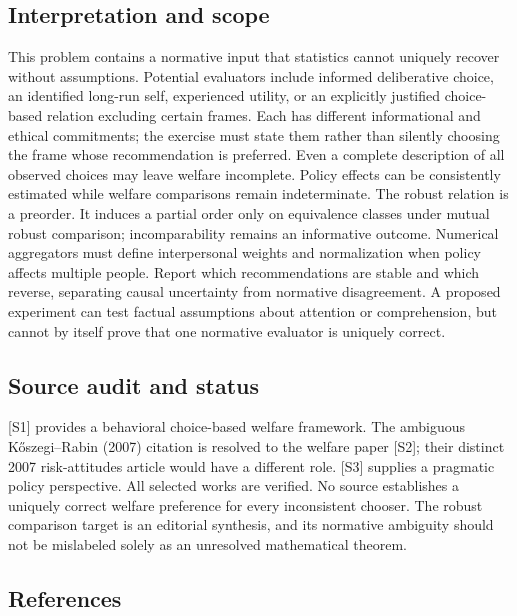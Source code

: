 \documentclass[11pt,a4paper]{article}
\begin{document}
\subsection*{Interpretation and scope}

This problem contains a normative input that statistics cannot uniquely recover without assumptions. Potential evaluators include informed deliberative choice, an identified long-run self, experienced utility, or an explicitly justified choice-based relation excluding certain frames. Each has different informational and ethical commitments; the exercise must state them rather than silently choosing the frame whose recommendation is preferred. Even a complete description of all observed choices may leave welfare incomplete. Policy effects can be consistently estimated while welfare comparisons remain indeterminate. The robust relation is a preorder. It induces a partial order only on equivalence classes under mutual robust comparison; incomparability remains an informative outcome. Numerical aggregators must define interpersonal weights and normalization when policy affects multiple people. Report which recommendations are stable and which reverse, separating causal uncertainty from normative disagreement. A proposed experiment can test factual assumptions about attention or comprehension, but cannot by itself prove that one normative evaluator is uniquely correct.

\subsection*{Source audit and status}

[S1] provides a behavioral choice-based welfare framework. The ambiguous Kőszegi--Rabin (2007) citation is resolved to the welfare paper [S2]; their distinct 2007 risk-attitudes article would have a different role. [S3] supplies a pragmatic policy perspective. All selected works are verified. No source establishes a uniquely correct welfare preference for every inconsistent chooser. The robust comparison target is an editorial synthesis, and its normative ambiguity should not be mislabeled solely as an unresolved mathematical theorem.

\subsection*{References}
\end{document}
